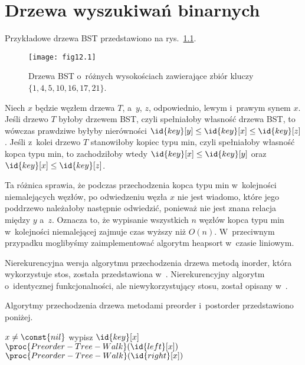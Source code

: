 \chapter{Drzewa wyszukiwań binarnych}


\exercise %
Przykładowe drzewa BST przedstawiono na rys.~\ref{fig:12.1-1}.
\begin{figure}[ht]
	\begin{center}
		\texttt{[image: fig12.1]}
	\end{center}
	\caption{Drzewa BST o~różnych wysokościach zawierające zbiór kluczy $\{1,4,5,10,16,17,21\}$.} \label{fig:12.1-1}
\end{figure}

\exercise %

\noindent Niech $x$ będzie węzłem drzewa $T$, a~$y$, $z$, odpowiednio, lewym i~prawym synem $x$. Jeśli drzewo $T$ byłoby drzewem BST, czyli spełniałoby własność drzewa BST, to wówczas prawdziwe byłyby nierówności $\id{key}[y]\le\id{key}[x]\le\id{key}[z]$. Jeśli z~kolei drzewo $T$ stanowiłoby kopiec typu min, czyli spełniałoby własność kopca typu min, to zachodziłoby wtedy $\id{key}[x]\le\id{key}[y]$ oraz $\id{key}[x]\le\id{key}[z]$.

Ta różnica sprawia, że podczas przechodzenia kopca typu min w~kolejności niemalejących węzłów, po odwiedzeniu węzła $x$ nie jest wiadomo, które jego poddrzewo należałoby następnie odwiedzić, ponieważ nie jest znana relacja między $y$ a~$z$. Oznacza to, że wypisanie wszystkich $n$ węzłów kopca typu min w~kolejności niemalejącej zajmuje czas wyższy niż $O(n)$. W~przeciwnym przypadku moglibyśmy zaimplementować algorytm heapsort w~czasie liniowym.

\exercise %
Nierekurencyjna wersja algorytmu przechodzenia drzewa metodą inorder, która wykorzystuje stos, została przedstawiona w~. Nierekurencyjny algorytm o~identycznej funkcjonalności, ale niewykorzystujący stosu, został opisany w~.

\exercise %
Algorytmy przechodzenia drzewa metodami preorder i~postorder przedstawiono poniżej. 
\begin{codebox}
\li	\If $x\ne\const{nil}$
\li		\Then
			wypisz $\id{key}[x]$
\li			$\proc{Preorder-Tree-Walk}(\id{left}[x])$
\li			$\proc{Preorder-Tree-Walk}(\id{right}[x])$
		\End
\end{codebox}

